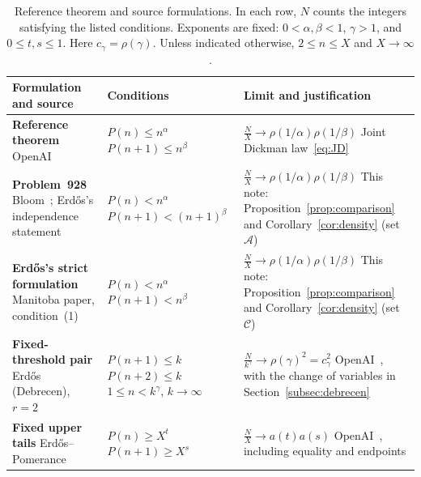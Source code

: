 \documentclass[11pt,a4paper]{amsart}
\newcommand{\A}{\mathcal A}
\newcommand{\C}{\mathcal C}
\begin{document}
\begin{table}[htbp]
\small
\caption{Reference theorem and source formulations.
In each row, $N$ counts the integers satisfying the listed conditions.
Exponents are fixed: \mbox{$0<\alpha,\beta<1$},
\mbox{$\gamma>1$}, and \mbox{$0\le t,s\le1$}.
Here $c_\gamma=\rho(\gamma)$.
Unless indicated otherwise, \mbox{$2\le n\le X$} and $X\to\infty$.}
\label{tab:forms}
\begin{tabularx}{\textwidth}{@{}L{43mm}L{45mm}Y@{}}
\toprule
Formulation and source & Conditions & Limit and justification\\
\midrule
\textbf{Reference theorem}\newline
OpenAI~\cite[Thm.~1.1, p.~2]{OpenAI2026}
 & $P(n)\le n^\alpha$\newline
   $P(n+1)\le n^\beta$
 & $\displaystyle\frac{N}{X}\to\rho(1/\alpha)\rho(1/\beta)$\newline
   Joint Dickman law~\eqref{eq:JD}\\[5pt]
\textbf{Problem~928}\newline
Bloom~\cite{Bloom928}; Erd\H{o}s's independence statement
\cite[p.~25]{Erdos1976Manitoba}
 & $P(n)<n^\alpha$\newline
   $P(n+1)<(n+1)^\beta$
 & $\displaystyle\frac{N}{X}\to\rho(1/\alpha)\rho(1/\beta)$\newline
   This note: Proposition~\ref{prop:comparison} and
   Corollary~\ref{cor:density} (set $\A$)\\[5pt]
\textbf{Erd\H{o}s's strict formulation}\newline
Manitoba paper, condition~(1)
\cite[p.~25]{Erdos1976Manitoba}
 & $P(n)<n^\alpha$\newline
   $P(n+1)<n^\beta$
 & $\displaystyle\frac{N}{X}\to\rho(1/\alpha)\rho(1/\beta)$\newline
   This note: Proposition~\ref{prop:comparison} and
   Corollary~\ref{cor:density} (set $\C$)\\[5pt]
\textbf{Fixed-threshold pair}\newline
Erd\H{o}s (Debrecen), $r=2$
\cite[pp.~272--273]{Erdos1976Debrecen}
 & $P(n+1)\le k$\newline
   $P(n+2)\le k$\newline
   $1\le n<k^\gamma$, $k\to\infty$
 & $\displaystyle\frac{N}{k^\gamma}\to\rho(\gamma)^2=c_\gamma^2$\newline
   OpenAI~\cite[(11.7), p.~80]{OpenAI2026}, with the
   change of variables in Section~\ref{subsec:debrecen}\\[5pt]
\textbf{Fixed upper tails}\newline
Erd\H{o}s--Pomerance~\cite[p.~311]{ErdosPomerance1978}
 & $P(n)\ge X^t$\newline
   $P(n+1)\ge X^s$
 & $\displaystyle\frac{N}{X}\to a(t)a(s)$\newline
   OpenAI~\cite[(11.8) and following paragraph, p.~80]{OpenAI2026},
   including equality and endpoints\\
\bottomrule
\end{tabularx}
\end{table}
\end{document}
